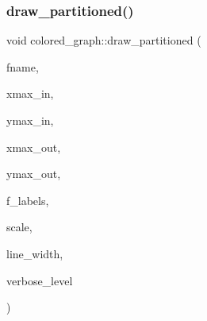 \mbox{\label{classcolored__graph_a244dcd80d20f6eeddd537a48a1541f96}} 
\subsubsection{\texorpdfstring{draw\+\_\+partitioned()}{draw\_partitioned()}}
{\footnotesize\ttfamily void colored\+\_\+graph\+::draw\+\_\+partitioned (\begin{DoxyParamCaption}\item[{const \mbox{\hyperlink{galois_8h_ab6cc7b4aeb6ea31aba2b3fbfc83ff5e6}{B\+Y\+TE}} $\ast$}]{fname,  }\item[{\mbox{\hyperlink{galois_8h_a09fddde158a3a20bd2dcadb609de11dc}{I\+NT}}}]{xmax\+\_\+in,  }\item[{\mbox{\hyperlink{galois_8h_a09fddde158a3a20bd2dcadb609de11dc}{I\+NT}}}]{ymax\+\_\+in,  }\item[{\mbox{\hyperlink{galois_8h_a09fddde158a3a20bd2dcadb609de11dc}{I\+NT}}}]{xmax\+\_\+out,  }\item[{\mbox{\hyperlink{galois_8h_a09fddde158a3a20bd2dcadb609de11dc}{I\+NT}}}]{ymax\+\_\+out,  }\item[{\mbox{\hyperlink{galois_8h_a09fddde158a3a20bd2dcadb609de11dc}{I\+NT}}}]{f\+\_\+labels,  }\item[{double}]{scale,  }\item[{double}]{line\+\_\+width,  }\item[{\mbox{\hyperlink{galois_8h_a09fddde158a3a20bd2dcadb609de11dc}{I\+NT}}}]{verbose\+\_\+level }\end{DoxyParamCaption})}

\mbox{\label{classcolored__graph_a258eaac656baacbcbc064a933f7f11b0}} 
